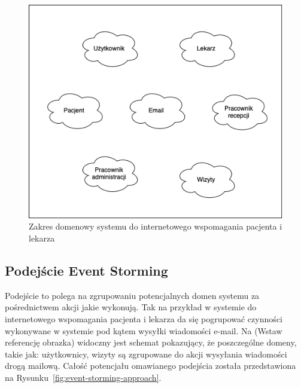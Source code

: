 \documentclass[12pt,twoside]{book}
\newcommand{\captionvspace}{\vspace{6pt}}
\begin{document}
\begin{figure}[ht]
\centering
\includegraphics[width=\textwidth]{includes/images/ddd-sdiwpil.png}
\captionvspace
\caption{Zakres domenowy systemu do internetowego wspomagania pacjenta i lekarza}
\label{fig:ddd-sdiwpil}
\end{figure}

\subsection{Podejście Event Storming}
Podejście to polega na zgrupowaniu potencjalnych domen systemu za pośrednictwem akcji jakie wykonują. Tak na przykład w systemie do internetowego wspomagania pacjenta i lekarza da się pogrupować czynności wykonywane w systemie pod kątem wysyłki wiadomości e-mail. Na (Wstaw referencję obrazka) widoczny jest schemat pokazujący, że poszczególne domeny, takie jak: użytkownicy, wizyty są zgrupowane do akcji wysyłania wiadomości drogą mailową. Całość potencjału omawianego podejścia została przedstawiona na Rysunku~\ref{fig:event-storming-approach}.
\end{document}
